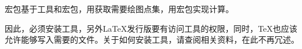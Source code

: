 \documentclass[../main.tex]{subfiles}
\begin{document}
宏包基于工具和宏包，用获取需要绘图点集，用宏包实现计算。

因此，必须安装工具，另外\LaTeX{}发行版要有访问工具的权限，同时，\TeX{}也应该允许能够写入需要的文件。关于如何安装工具，请查阅相关资料，在此不再冗述。
\end{document}
